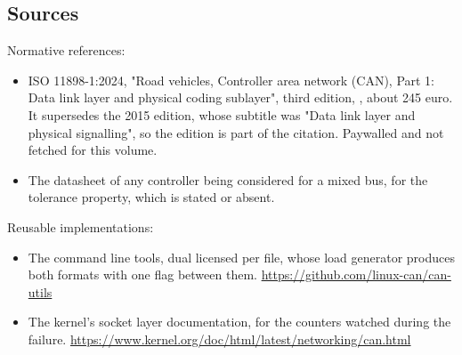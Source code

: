\subsection*{Sources}

Normative references:
\begin{itemize}
\item ISO 11898-1:2024, "Road vehicles, Controller area network (CAN), Part 1:
Data link layer and physical coding sublayer", third edition, , about
245 euro. It supersedes the 2015 edition, whose subtitle was "Data link layer
and physical signalling", so the edition is part of the citation. Paywalled and
not fetched for this volume.
\item The datasheet of any controller being considered for a mixed bus, for the
tolerance property, which is stated or absent.
\end{itemize}

Reusable implementations:
\begin{itemize}
\item The command line tools, dual licensed per file, whose load generator
produces both formats with one flag between them.\newline
\url{https://github.com/linux-can/can-utils}
\item The kernel's socket layer documentation, for the counters watched during
the failure.\newline
\url{https://www.kernel.org/doc/html/latest/networking/can.html}
\end{itemize}
